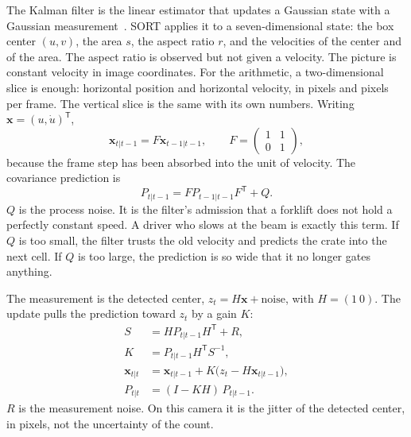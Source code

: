 \documentclass[11pt,a4paper]{article}
\begin{document}
The Kalman filter is the linear estimator that updates a Gaussian state with a Gaussian measurement~\cite{kalman1960}. SORT applies it to a seven-dimensional state: the box center $(u,v)$, the area $s$, the aspect ratio $r$, and the velocities of the center and of the area. The aspect ratio is observed but not given a velocity. The picture is constant velocity in image coordinates. For the arithmetic, a two-dimensional slice is enough: horizontal position and horizontal velocity, in pixels and pixels per frame. The vertical slice is the same with its own numbers. Writing $\mathbf{x}=(u,\dot u)^{\mathsf T}$,
\begin{equation}
\mathbf{x}_{t|t-1} = F\mathbf{x}_{t-1|t-1},
\qquad
F = \begin{pmatrix} 1 & 1 \\ 0 & 1 \end{pmatrix},
\label{eq:predict}
\end{equation}
because the frame step has been absorbed into the unit of velocity. The covariance prediction is
\begin{equation}
P_{t|t-1} = F P_{t-1|t-1} F^{\mathsf T} + Q.
\label{eq:pcov}
\end{equation}
$Q$ is the process noise. It is the filter's admission that a forklift does not hold a perfectly constant speed. A driver who slows at the beam is exactly this term. If $Q$ is too small, the filter trusts the old velocity and predicts the crate into the next cell. If $Q$ is too large, the prediction is so wide that it no longer gates anything.

The measurement is the detected center, $z_t = H\mathbf{x} + \mathrm{noise}$, with $H=(1\ 0)$. The update pulls the prediction toward $z_t$ by a gain $K$:
\begin{align}
S &= H P_{t|t-1} H^{\mathsf T} + R, \nonumber\\
K &= P_{t|t-1} H^{\mathsf T} S^{-1}, \nonumber\\
\mathbf{x}_{t|t} &= \mathbf{x}_{t|t-1} + K\bigl(z_t - H\mathbf{x}_{t|t-1}\bigr), \nonumber\\
P_{t|t} &= (I - KH)\,P_{t|t-1}.
\label{eq:update}
\end{align}
$R$ is the measurement noise. On this camera it is the jitter of the detected center, in pixels, not the uncertainty of the count.
\end{document}
